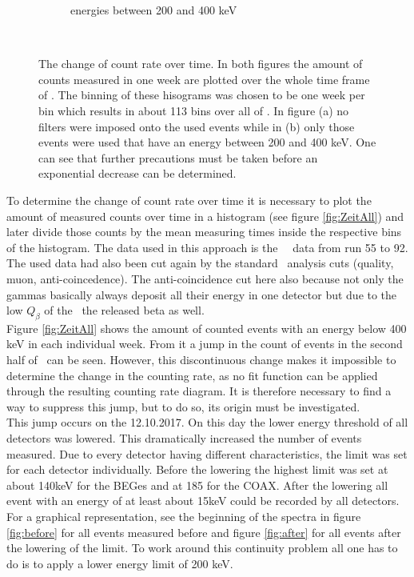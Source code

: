 \documentclass[encoding=utf8,british]{tumphthesis}
\begin{document}
\begin{figure}[t!]
\begin{subfigure}{.475\textwidth}
		\caption{energies between 200 and 400 keV}
		\label{fig:ZeitLimits}
	\end{subfigure}
    \\
    \caption{
    	The change of count rate over time.
    	In both figures the amount of counts measured in one week are plotted over the whole time frame of \PII. 
        The binning of these hisograms was chosen to be one week per bin which results in about 113 bins over all of  \PII.
    	In figure (a) no filters were imposed onto the used events while in (b) only those events were used that have an energy between 200 and 400 keV. 
    	One can see that further precautions must be taken before an exponential decrease can be determined. 
    	}
\end{figure}

To determine the change of count rate over time it is necessary to plot the amount of measured counts over time in a histogram (see figure \ref{fig:ZeitAll}) and later divide those counts by the mean measuring times inside the respective bins of the histogram.
The data used in this approach is the \gerda\ \PII\ data from run 55 to 92.
The used data had also been cut again by the standard \gerda\ analysis cuts (quality, muon, anti-coincedence).
The anti-coincidence cut here also because not only the gammas basically always deposit all their energy in one detector but due to the low  $Q_\beta$ of the \Kr\ the released beta as well.
 \\

Figure \ref{fig:ZeitAll} shows the amount of counted events with an energy below 400 keV in each individual week.
From it a jump in the count of events in the second half of \PII\ can be seen.
However, this discontinuous change makes it impossible to determine the change in the counting rate, as no fit function can be applied through the resulting counting rate diagram. 
It is therefore necessary to find a way to suppress this jump, but to do so, its origin must be investigated.
\\

This jump occurs on the 12.10.2017.
On this day the lower energy threshold of all detectors was lowered.
This dramatically increased the number of events measured.
Due to every detector having different characteristics, the limit was set for each detector individually.
Before the lowering the highest limit was set at about 140keV for the BEGes and at 185 for the COAX.
After the lowering all event with an energy of at least about 15keV could be recorded by all detectors.
For a graphical representation, see the beginning of the spectra in figure \ref{fig:before} for all events measured before and figure \ref{fig:after} for all events after the lowering of the limit. 
To work around this continuity problem all one has to do is to apply a lower energy limit of 200 keV.
\\
\end{document}
